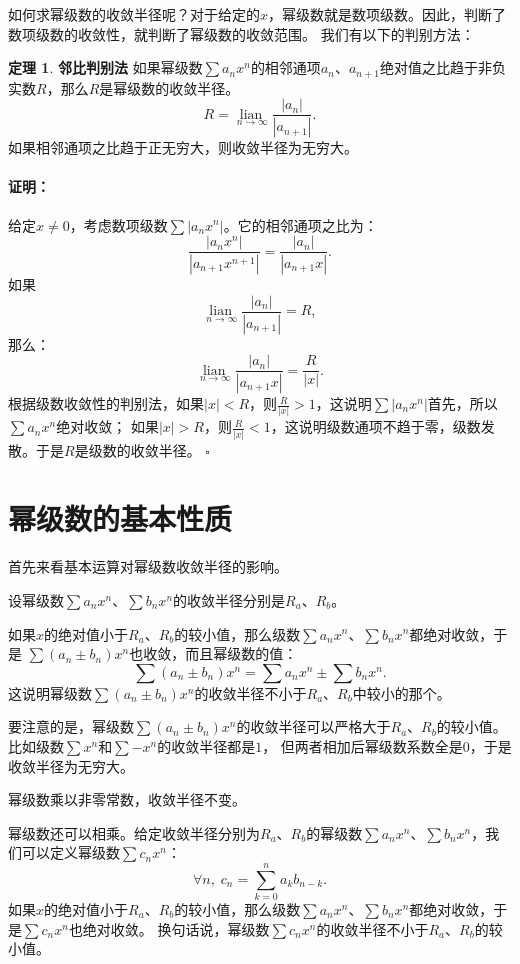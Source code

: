 \documentclass[12pt,UTF8]{ctexbook}
\newcommand{\lian}[1]{
    \underset{#1}{\operatorname{lian}\,}
}
\theoremstyle{definition}
\newtheorem{tm}{定理}[section]
\theoremstyle{plain}
\renewenvironment{proof}{\paragraph{\textbf{证明：}}}{\hfill$\square$}
\begin{document}
\begin{appendix}
如何求幂级数的收敛半径呢？对于给定的$x$，幂级数就是数项级数。因此，判断了数项级数的收敛性，就判断了幂级数的收敛范围。
我们有以下的判别方法：

\begin{tm}{\textbf{邻比判别法}}
    如果幂级数$\sum a_n x^n$的相邻通项$a_n$、$a_{n+1}$绝对值之比趋于非负实数$R$，那么$R$是幂级数的收敛半径。
    $$ R = \lian{n\to\infty} \frac{|a_n|}{|a_{n+1}|}. $$
    如果相邻通项之比趋于正无穷大，则收敛半径为无穷大。
\end{tm}

\begin{proof}
    给定$x\neq 0$，考虑数项级数$\sum |a_n x^n|$。它的相邻通项之比为：
    $$ \frac{|a_n x^n|}{|a_{n+1} x^{n+1}|} = \frac{|a_n|}{|a_{n+1}x|}. $$
    如果
    $$ \lian{n\to\infty} \frac{|a_n|}{|a_{n+1}|} = R,$$
    那么：
    $$ \lian{n\to\infty} \frac{|a_n|}{|a_{n+1}x|} = \frac{R}{|x|}.$$
    根据级数收敛性的判别法，如果$|x|<R$，则$\frac{R}{|x|} > 1$，这说明$\sum |a_n x^n|$首先，所以$\sum a_n x^n$绝对收敛；
    如果$|x|>R$，则$\frac{R}{|x|} < 1$，这说明级数通项不趋于零，级数发散。于是$R$是级数的收敛半径。
\end{proof}

\section{幂级数的基本性质}

首先来看基本运算对幂级数收敛半径的影响。

设幂级数$\sum a_n x^n$、$\sum b_n x^n$的收敛半径分别是$R_a$、$R_b$。

如果$x$的绝对值小于$R_a$、$R_b$的较小值，那么级数$\sum a_n x^n$、$\sum b_n x^n$都绝对收敛，于是
$\sum (a_n \pm b_n) x^n$也收敛，而且幂级数的值：
$$\sum (a_n \pm b_n) x^n = \sum a_n x^n \pm \sum b_n x^n.$$
这说明幂级数$\sum (a_n \pm b_n) x^n$的收敛半径不小于$R_a$、$R_b$中较小的那个。

要注意的是，幂级数$\sum (a_n \pm b_n) x^n$的收敛半径可以严格大于$R_a$、$R_b$的较小值。比如级数$\sum x^n$和$\sum -x^n$的收敛半径都是$1$，
但两者相加后幂级数系数全是$0$，于是收敛半径为无穷大。

幂级数乘以非零常数，收敛半径不变。

幂级数还可以相乘。给定收敛半径分别为$R_a$、$R_b$的幂级数$\sum a_n x^n$、$\sum b_n x^n$，我们可以定义幂级数$\sum c_n x^n$：
$$ \forall n, \; c_n = \sum_{k=0}^n a_k b_{n-k}.$$
如果$x$的绝对值小于$R_a$、$R_b$的较小值，那么级数$\sum a_n x^n$、$\sum b_n x^n$都绝对收敛，于是$\sum c_n x^n$也绝对收敛。
换句话说，幂级数$\sum c_n x^n$的收敛半径不小于$R_a$、$R_b$的较小值。


\end{appendix}
\end{document}
